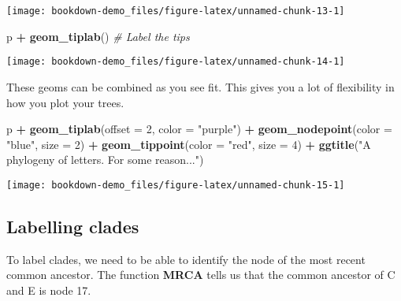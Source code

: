 \documentclass[]{book}
\newenvironment{Shaded}{\begin{snugshade}}{\end{snugshade}}
\newcommand{\KeywordTok}[1]{\textcolor[rgb]{0.13,0.29,0.53}{\textbf{#1}}}
\newcommand{\DataTypeTok}[1]{\textcolor[rgb]{0.13,0.29,0.53}{#1}}
\newcommand{\DecValTok}[1]{\textcolor[rgb]{0.00,0.00,0.81}{#1}}
\newcommand{\StringTok}[1]{\textcolor[rgb]{0.31,0.60,0.02}{#1}}
\newcommand{\CommentTok}[1]{\textcolor[rgb]{0.56,0.35,0.01}{\textit{#1}}}
\newcommand{\OperatorTok}[1]{\textcolor[rgb]{0.81,0.36,0.00}{\textbf{#1}}}
\newcommand{\NormalTok}[1]{#1}
\begin{document}
\begin{center}\texttt{[image: bookdown-demo\_files/figure-latex/unnamed-chunk-13-1]} \end{center}

\begin{Shaded}
\begin{Highlighting}[]
\NormalTok{p }\OperatorTok{+}\StringTok{ }\KeywordTok{geom_tiplab}\NormalTok{() }\CommentTok{# Label the tips}
\end{Highlighting}
\end{Shaded}

\begin{center}\texttt{[image: bookdown-demo\_files/figure-latex/unnamed-chunk-14-1]} \end{center}

These geoms can be combined as you see fit. This gives you a lot of
flexibility in how you plot your trees.

\begin{Shaded}
\begin{Highlighting}[]
\NormalTok{p }\OperatorTok{+}\StringTok{ }
\StringTok{  }\KeywordTok{geom_tiplab}\NormalTok{(}\DataTypeTok{offset =} \DecValTok{2}\NormalTok{, }\DataTypeTok{color =} \StringTok{"purple"}\NormalTok{) }\OperatorTok{+}
\StringTok{  }\KeywordTok{geom_nodepoint}\NormalTok{(}\DataTypeTok{color =} \StringTok{"blue"}\NormalTok{, }\DataTypeTok{size =} \DecValTok{2}\NormalTok{) }\OperatorTok{+}
\StringTok{  }\KeywordTok{geom_tippoint}\NormalTok{(}\DataTypeTok{color =} \StringTok{"red"}\NormalTok{, }\DataTypeTok{size =} \DecValTok{4}\NormalTok{) }\OperatorTok{+}
\StringTok{  }\KeywordTok{ggtitle}\NormalTok{(}\StringTok{"A phylogeny of letters. For some reason..."}\NormalTok{)}
\end{Highlighting}
\end{Shaded}

\begin{center}\texttt{[image: bookdown-demo\_files/figure-latex/unnamed-chunk-15-1]} \end{center}

\subsection{Labelling clades}\label{labelling-clades}

To label clades, we need to be able to identify the node of the most
recent common ancestor. The function \textbf{MRCA} tells us that the
common ancestor of C and E is node 17.
\end{document}
